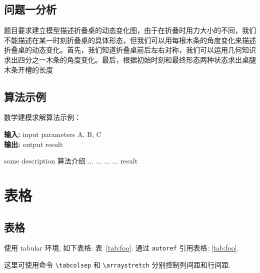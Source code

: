 \documentclass[bwprint,fontset=fandol]{gmcmthesis}
\begin{document}
\subsection{问题一分析}
题目要求建立模型描述折叠桌的动态变化图，由于在折叠时用力大小的不同，我们不能描述在某一时刻折叠桌的具体形态，但我们可以用每根木条的角度变化来描述折叠桌的动态变化。首先，我们知道折叠桌前后左右对称，我们可以运用几何知识求出四分之一木条的角度变化。最后，根据初始时刻和最终形态两种状态求出桌腿木条开槽的长度


\subsection{算法示例}

数学建模求解算法示例：
\begin{center}
\begin{minipage}{0.8\textwidth}
\begin{algorithm}[H]%
\caption{算法的名字} %
{\bf 输入:} %
input parameters A, B, C\\
{\bf 输出:} %
output result
\begin{algorithmic}[1]
\State some description 算法介绍 %
  \State ...
    \State ...
  \Else
    \State ...
  \EndIf
\EndFor
{} %
  \State ...
\EndWhile
\State \Return result
\end{algorithmic}
\end{algorithm}
\end{minipage}
\end{center}
\vspace{2ex}

\section{表格}

\subsection{表格}

使用 tabular 环境, 如下表格: 表~\ref{tab:foo}. 通过 \verb|autoref| 引用表格: \autoref{tab:foo}.

这里可使用命令 \verb|\tabcolsep| 和 \verb|\arraystretch| 分别控制列间距和行间距.
\end{document}
